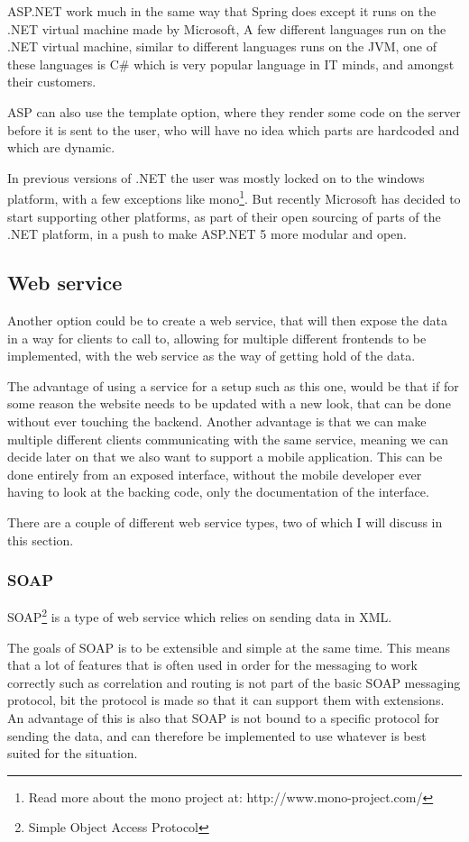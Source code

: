 ASP.NET work much in the same way that Spring does except it runs on the .NET virtual machine made by Microsoft, A few different languages run on the .NET virtual machine, similar to different languages runs on the JVM, one of these languages is C\# which is very popular language in IT minds, and amongst their customers.

ASP can also use the template option, where they render some code on the server before it is sent to the user, who will have no idea which parts are hardcoded and which are dynamic.

In previous versions of .NET the user was mostly locked on to the windows platform, with a few exceptions like mono\footnote{Read more about the mono project at: http://www.mono-project.com/}. But recently Microsoft has decided to start supporting other platforms, as part of their open sourcing of parts of the .NET platform\cite{.net-core}, in a push to make ASP.NET 5 more modular and open.

\subsection{Web service}
\label{sub:Web service}
Another option could be to create a web service, that will then expose the data in a way for clients to call to, allowing for multiple different frontends to be implemented, with the web service as the way of getting hold of the data.

The advantage of using a service for a setup such as this one, would be that if for some reason the website needs to be updated with a new look, that can be done without ever touching the backend. Another advantage is that we can make multiple different clients communicating with the same service, meaning we can decide later on that we also want to support a mobile application. This can be done entirely from an exposed interface, without the mobile developer ever having to look at the backing code, only the documentation of the interface.

There are a couple of different web service types, two of which I will discuss in this section.

\subsubsection{SOAP}
\label{subs:SOAP}
SOAP\footnote{Simple Object Access Protocol} is a type of web service which relies on sending data in XML.

The goals of SOAP is to be extensible and simple at the same time\cite{soap:messaging}. This means that a lot of features that is often used in order for the messaging to work correctly such as correlation and routing is not part of the basic SOAP messaging protocol, bit the protocol is made so that it can support them with extensions. An advantage of this is also that SOAP is not bound to a specific protocol for sending the data, and can therefore be implemented to use whatever is best suited for the situation.


